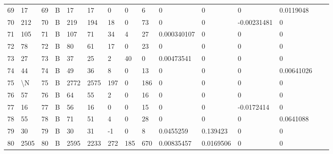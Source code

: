 \begin{longtable}{lllllllllllllll}
	69  & 17                & 69  & B   & 17                & 17                & 0                 & 0    & 6          & 0              & 0              & 0             & 0.0119048    \\
	70  & 212               & 70  & B   & 219               & 194               & 18                & 0    & 73         & 0              & 0              & -0.00231481   & 0            \\
	71  & 105               & 71  & B   & 107               & 71                & 34                & 4    & 27         & 0.000340107    & 0              & 0             & 0            \\
	72  & 78                & 72  & B   & 80                & 61                & 17                & 0    & 23         & 0              & 0              & 0             & 0            \\
	73  & 27                & 73  & B   & 37                & 25                & 2                 & 40   & 0          & 0.00473541     & 0              & 0             & 0            \\
	74  & 44                & 74  & B   & 49                & 36                & 8                 & 0    & 13         & 0              & 0              & 0             & 0.00641026   \\
	75  & \textbackslash{}N & 75  & B   & 2772              & 2575              & 197               & 0    & 186        & 0              & 0              & 0             & 0            \\
	76  & 57                & 76  & B   & 64                & 55                & 2                 & 0    & 16         & 0              & 0              & 0             & 0            \\
	77  & 16                & 77  & B   & 56                & 16                & 0                 & 0    & 15         & 0              & 0              & -0.0172414    & 0            \\
	78  & 55                & 78  & B   & 71                & 51                & 4                 & 0    & 28         & 0              & 0              & 0             & 0.0641088    \\
	79  & 30                & 79  & B   & 30                & 31                & -1                & 0    & 8          & 0.0455259      & 0.139423       & 0             & 0            \\
	80  & 2505              & 80  & B   & 2595              & 2233              & 272               & 185  & 670        & 0.00835457     & 0.0169506      & 0             & 0            \\

\end{longtable}
